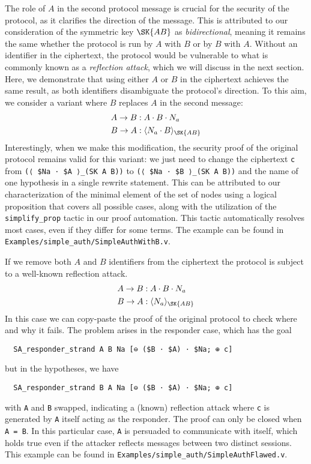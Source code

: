The role of $A$ in the second protocol message is crucial for the security of the protocol, as it clarifies the direction of the message.
This is attributed to our consideration of the symmetric key $\SK{AB}$ as \emph{bidirectional}, meaning it remains the same whether the protocol is run by $A$ with $B$ or by $B$ with $A$.
Without an identifier in the ciphertext, the protocol would be vulnerable to what is commonly known as a \emph{reflection attack}, which we will discuss in the next section.
Here, we demonstrate that using either $A$ or $B$ in the ciphertext achieves the same result, as both identifiers disambiguate the protocol's direction.
To this aim, we consider a variant where $B$ replaces $A$ in the second message:
\vspace*{-0.2cm}
\begin{align*}
  A \rightarrow B & : A \cdot B \cdot N_a \\
  B \rightarrow A & : \enc{N_a \cdot B}{ \SK{AB}}
\end{align*}
Interestingly, when we make this modification, the security proof of the original protocol remains valid for this variant: we just need to change the ciphertext \lstinline{c} from \lstinline{(⟨ $Na ⋅ $A ⟩_(SK A B))} to \lstinline{(⟨ $Na ⋅ $B ⟩_(SK A B))} and the name of one hypothesis in a single rewrite statement.
This can be attributed to our characterization of the minimal element of the set of nodes using a logical proposition that covers all possible cases, along with the utilization of the \lstinline{simplify_prop} tactic in our proof automation.
This tactic automatically resolves most cases, even if they differ for some terms.
The example can be found in \lstinline{Examples/simple_auth/SimpleAuthWithB.v}.

If we remove both $A$ and $B$ identifiers from the ciphertext the protocol is subject to a well-known reflection attack.
\begin{align*}
  A \rightarrow B & : A \cdot B \cdot N_a \\
  B \rightarrow A & : \enc{N_a }{ \SK{AB}}
\end{align*}
In this case we can copy-paste the proof of the original protocol to check where and why it fails.
The problem arises in the responder case, which has the goal
\begin{lstlisting}
  SA_responder_strand A B Na [⊖ ($B ⋅ $A) ⋅ $Na; ⊕ c]
\end{lstlisting}
but in the hypotheses, we have
\begin{lstlisting}
  SA_responder_strand B A Na [⊖ ($B ⋅ $A) ⋅ $Na; ⊕ c]
\end{lstlisting}
with \lstinline{A} and \lstinline{B} swapped, indicating a (known) reflection attack where \lstinline{c} is generated by \lstinline{A} itself acting as the responder.
The proof can only be closed when \lstinline{A = B}.
In this particular case, \lstinline{A} is persuaded to communicate with itself, which holds true even if the attacker reflects messages between two distinct sessions.
This example can be found in \lstinline{Examples/simple_auth/SimpleAuthFlawed.v}.


